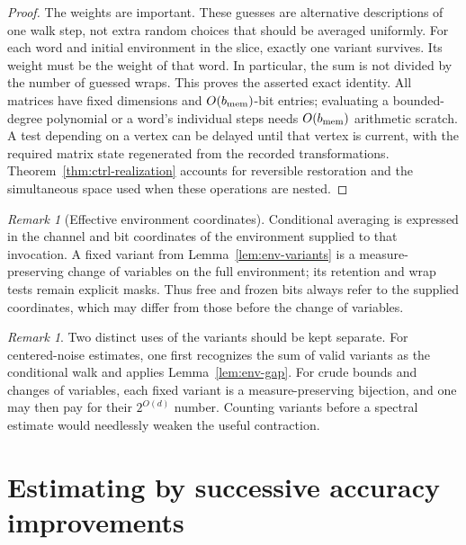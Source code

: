 \documentclass[11pt]{article}
\numberwithin{equation}{section}
\theoremstyle{definition}
\theoremstyle{remark}
\newtheorem{remark}[theorem]{Remark}
\begin{document}
\begin{proof}
The weights are important. These guesses are alternative descriptions of one walk step, not extra random choices that should be averaged uniformly. For each word and initial environment in the slice, exactly one variant survives. Its weight must be the weight of that word.
In particular, the sum is not divided by the number of guessed
wraps. This proves the asserted exact identity.
All matrices have fixed dimensions and $O({b_{\rm mem}})$-bit entries;
evaluating a bounded-degree polynomial or a word's individual steps
needs $O({b_{\rm mem}})$ arithmetic scratch. A test depending on a vertex can
be delayed until that vertex is current, with the required matrix
state regenerated from the recorded transformations.
Theorem~\ref{thm:ctrl-realization} accounts for reversible restoration
and the simultaneous space used when these operations are nested.
\end{proof}

\begin{remark}[Effective environment coordinates]
\label{rem:env-effective}
Conditional averaging is expressed in the channel and bit coordinates
of the environment supplied to that invocation. A fixed variant from
Lemma~\ref{lem:env-variants} is a measure-preserving change of variables
on the full environment; its retention and wrap tests remain explicit masks.
Thus free and frozen bits always refer to the supplied coordinates,
which may differ from those before the change of variables.
\end{remark}

\begin{remark}\label{rem:env-averaging}
Two distinct uses of the variants should be kept separate.
For centered-noise estimates, one first recognizes the sum of valid
variants as the conditional walk and applies
Lemma~\ref{lem:env-gap}. For crude bounds and changes of variables,
each fixed variant is a measure-preserving bijection, and one may
then pay for their $2^{O(d)}$ number. Counting variants before a
spectral estimate would needlessly weaken the useful contraction.
\end{remark}





\section{Estimating by successive accuracy improvements}
\label{sec:est}
\end{document}
